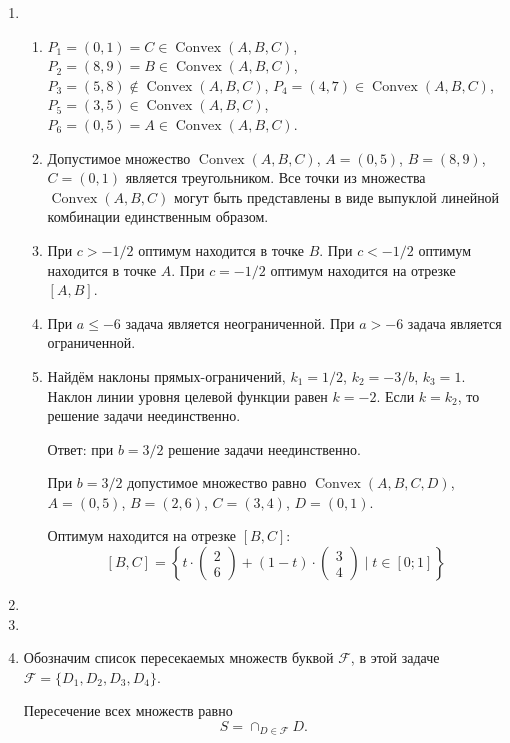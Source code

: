\documentclass[12pt]{article}
\newcommand{\cF}{\mathcal{F}}
\DeclareMathOperator{\Convex}{Convex}
\DeclareMathOperator{\hull}{\Convex}
\begin{document}
\begin{enumerate}
  \item %
  \begin{enumerate}
    \item $P_1 = (0, 1) = C \in \hull(A, B, C)$, $P_2 = (8, 9) = B \in \hull(A, B, C)$, 
    $P_3 = (5, 8) \notin \hull(A, B, C)$, $P_4 = (4, 7) \in \hull(A, B, C)$,
    $P_5 = (3, 5) \in \hull(A, B, C)$, $P_6 = (0, 5) = A  \in \hull(A, B, C)$. 
    \item Допустимое множество $\hull(A, B, C)$, $A = (0, 5)$, $B = (8, 9)$, $C = (0, 1)$ является треугольником. 
    Все точки из множества $\hull(A, B, C)$ могут быть представлены в виде выпуклой линейной комбинации единственным образом. 
    \item При $c > -1/2$ оптимум находится в точке $B$. 
    При $c < -1/2$ оптимум находится в точке $A$. 
    При $c = -1/2$ оптимум находится на отрезке $[A, B]$.
    \item При $a \leq -6$ задача является неограниченной. 
    При $a > -6$ задача является ограниченной. 
    \item Найдём наклоны прямых-ограничений, $k_1 = 1/2$, $k_2 = -3/b$, $k_3 = 1$.
    Наклон линии уровня целевой функции равен $k = -2$.
    Если $k = k_2$, то решение задачи неединственно.
    
    Ответ: при $b = 3/2$ решение задачи неединственно. 

    При $b=3/2$ допустимое множество равно $\hull(A, B, C, D)$, $A =(0, 5)$, $B=(2, 6)$, $C=(3, 4)$, $D=(0,1)$.

    Оптимум находится на отрезке $[B, C]$:
    \[
    [B, C] =  \left\{  t \cdot \begin{pmatrix}
      2 \\
      6
    \end{pmatrix}  + (1 - t)  \cdot \begin{pmatrix}
      3 \\
      4
    \end{pmatrix}   \mid t \in [0;1] \right\}
    \]


  \end{enumerate}

\item 
\item 

\item Обозначим список пересекаемых множеств буквой $\cF$, в этой задаче $\cF = \{D_1, D_2, D_3, D_4\}$.

Пересечение всех множеств равно 
\[
  S = \cap_{D \in \cF} D.
\] 


\end{enumerate}
\end{document}
